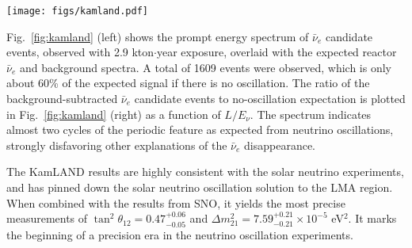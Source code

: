 \begin{figure*}[htb] \label{fig:kamland}
  \centering
  \texttt{[image: figs/kamland.pdf]}
  \caption{{\bf KamLAND results} \cite{Kamland08}: (left) Prompt energy spectrum of $\bar\nu_e$ candidate
  events. All histograms corresponding to reactor spectra and expected
  backgrounds incorporate the energy-dependent selection efficiency
  (top panel). The shaded background and geoneutrino histograms are
  cumulative. 
  (right) Ratio of the background-subtracted
  $\bar\nu_e$ spectrum to the expectation for no-oscillation as a
  function of $L_{0}/E_{\nu}$. $L_{0}$ is the effective baseline taken as a
  flux-weighted average ($L_{0}$\,=\,180\,km). The oscillation survival probability using the best estimates of $\theta_{12}$ and $|\Delta{m}^2_{21}|$ is given by the blue curve.}
\end{figure*}

Fig.~\ref{fig:kamland} (left) shows the prompt energy spectrum of $\bar\nu_e$ candidate
events, observed with 2.9 kton$\cdot$year exposure, overlaid with the expected reactor $\bar\nu_{e}$ and background spectra. A total of 1609 events were observed, which is only about 60\% of the expected signal if there is no oscillation. The ratio of the background-subtracted $\bar\nu_e$ candidate events to no-oscillation expectation is plotted in Fig.~\ref{fig:kamland} (right) as a function of $L/E_{\nu}$. The spectrum indicates almost two cycles of the periodic feature as expected from neutrino oscillations, strongly disfavoring other explanations of the $\bar\nu_e$ disappearance.

The KamLAND results \cite{Kamland03,Kamland05,Kamland08} are highly consistent with the solar neutrino experiments, and has pinned down the solar neutrino oscillation solution to the LMA region. When combined with the results from SNO, it yields the most precise measurements of $\tan^2\theta_{12} = 0.47^{+0.06}_{-0.05}$ and $\Delta m^2_{21} = 7.59^{+0.21}_{-0.21} \times 10^{-5}$ eV$^2$. It marks the beginning of a precision era in the neutrino oscillation experiments.

